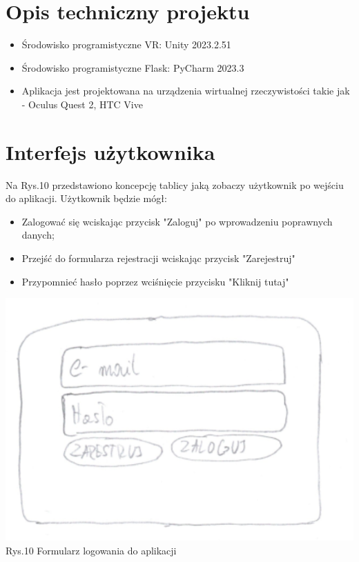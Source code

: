 \documentclass[12pt, letterpaper]{article}
\begin{document}
		
		\section{Opis techniczny projektu}
		
		\begin{itemize}
				\item Środowisko programistyczne VR: Unity 2023.2.51
				\item Środowisko programistyczne Flask: PyCharm 2023.3
				\item Aplikacja jest projektowana na urządzenia wirtualnej rzeczywistości takie jak - Oculus Quest 2, HTC Vive
		\end{itemize}
			
		\newpage
		\section{Interfejs użytkownika}
		
		Na Rys.10 przedstawiono koncepcję tablicy jaką zobaczy użytkownik po wejściu do aplikacji. Użytkownik będzie mógł:
		\begin{itemize}
				\item Zalogować się wciskając przycisk "Zaloguj" po wprowadzeniu poprawnych danych;
				\item Przejść do formularza rejestracji wciskając przycisk "Zarejestruj"
				\item Przypomnieć hasło poprzez wciśnięcie przycisku "Kliknij tutaj"
		\end{itemize}
		
		\begin{center}
			\includegraphics[scale=0.5]{GUI_logowanie}\\
			\caption{Rys.10 Formularz logowania do aplikacji}
		\end{center}
	
\end{document}
